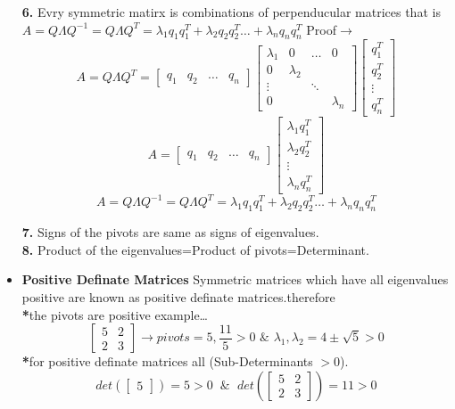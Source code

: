 \documentclass[a4paper,11pt]{article}
\numberwithin{equation}{section}
\begin{document}
\begin{itemize}
\textbf{6.} Evry symmetric matirx is combinations of perpenducular matrices that is $A=Q\varLambda Q^{-1}=Q\varLambda Q^T=\lambda_1q_1q_1^T+\lambda_2q_2q_2^T\dots+\lambda_nq_nq_n^T$ Proof$\rightarrow$
\[
A=Q\varLambda Q^T=\begin{bmatrix}
    q_1&q_2&\dots&q_n
\end{bmatrix}\begin{bmatrix}
    \lambda_1&0&\dots&0\\
    0&\lambda_2&&\\
    \vdots&&\ddots&\\
    0&&&\lambda_n
\end{bmatrix}\begin{bmatrix}
    q_1^T\\q_2^T\\\vdots\\q_n^T
\end{bmatrix}
\]
\[
A=\begin{bmatrix}
    q_1&q_2&\dots&q_n
\end{bmatrix}\begin{bmatrix}
    \lambda_1q_1^T\\\lambda_2q_2^T\\\vdots\\\lambda_nq_n^T
\end{bmatrix}
\]
\[
A=Q\varLambda Q^{-1}=Q\varLambda Q^T=\lambda_1q_1q_1^T+\lambda_2q_2q_2^T\dots+\lambda_nq_nq_n^T
\]

\textbf{7. }Signs of the pivots are same as signs of eigenvalues.\\
\textbf{8. }Product of the eigenvalues=Product of pivots=Determinant.\\

\item \textbf{Positive Definate Matrices} Symmetric matrices which have all eigenvalues positive are known as positive definate matrices.therefore \\

\textbf{*}the pivots are positive example\dots
\[
\begin{bmatrix}
    5&2\\2&3
\end{bmatrix}\rightarrow pivots =5,\frac{11}{5}>0 \hspace{4pt} \& \hspace{4pt} \lambda_1,\lambda_2 =4\pm \sqrt{5}>0
\]
\textbf{*}for positive definate matrices all (Sub-Determinants $>0$).
\[
det\left(\begin{bmatrix}
    5
\end{bmatrix}\right)=5>0 \hspace{7pt} \& \hspace{7pt} det\left(\begin{bmatrix}
    5&2\\2&3
\end{bmatrix}\right)=11>0
\]


\end{itemize}
\end{document}
